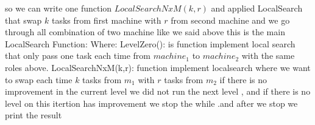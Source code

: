 \documentclass[11pt,fullpage]{article}
\begin{document}
so we can write one function $LocalSearchNxM(k,r)$ and applied LocalSearch that swap $k$ tasks from first machine with $r$ from second machine  and we go through all combination of two machine like we said above \newline
this is the main LocalSearch Function:\newline
Where: \newline
LevelZero(): is function implement local search that only pass one task each time from $machine_1$ to $machine_2$ with the same roles above.\newline
 LocalSearchNxM(k,r): function implement localsearch where we want to swap each time $k$ tasks from $m_1$ with $r$ tasks from $m_2$ \newline
if  there is no improvement in the current level we did not run the next level , and if there is no level on this itertion has improvement we stop the while .and after we stop we print the result
 
\end{document}
